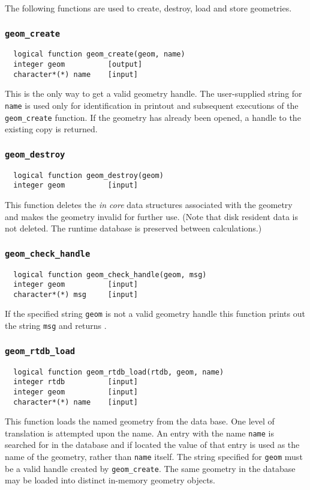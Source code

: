 The following functions are used to create, destroy, load and store geometries.

\subsubsection{{\tt geom\_create}}
\begin{verbatim}
  logical function geom_create(geom, name)
  integer geom          [output]
  character*(*) name    [input]
\end{verbatim}
This is the only way to get a valid geometry handle.  The user-supplied string
for {\tt name}
is used only for identification in printout and subsequent executions of
the \verb+geom_create+ function.
If the geometry has already been opened, a handle to the existing copy is
returned.

\subsubsection{{\tt geom\_destroy}}
\begin{verbatim}
  logical function geom_destroy(geom)
  integer geom          [input]
\end{verbatim}
This function deletes the {\em in core} data structures associated with the geometry and
makes the geometry invalid for further use.  (Note that disk resident data is
not deleted.  The runtime database is preserved between calculations.)

\subsubsection{{\tt geom\_check\_handle}}
\begin{verbatim}
  logical function geom_check_handle(geom, msg)
  integer geom          [input]
  character*(*) msg     [input]
\end{verbatim}
If the specified string {\tt geom} is not a valid geometry handle
 this function prints out 
the string {\tt msg}
and returns \FALSE.

\subsubsection{{\tt geom\_rtdb\_load}}
\begin{verbatim}
  logical function geom_rtdb_load(rtdb, geom, name)
  integer rtdb          [input]
  integer geom          [input]
  character*(*) name    [input]
\end{verbatim}
This function loads the named geometry from the data base.  One level of translation is
attempted upon the name.  An entry with the name {\tt name} is searched
for in the database and if located the value of that entry is used as
the name of the geometry, rather than {\tt name} itself.  The string specified
for {\tt geom}
must be a valid handle created by \verb+geom_create+.  The same
geometry in the database may be loaded into distinct in-memory geometry
objects.

